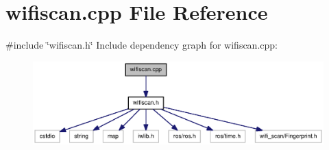 \section{wifiscan.\-cpp \-File \-Reference}
\label{wifiscan_8cpp}
{\ttfamily \#include \char`\"{}wifiscan.\-h\char`\"{}}\*
\-Include dependency graph for wifiscan.\-cpp\-:\nopagebreak
\begin{figure}[H]
\begin{center}
\leavevmode
\includegraphics[width=350pt]{wifiscan_8cpp__incl}
\end{center}
\end{figure}
